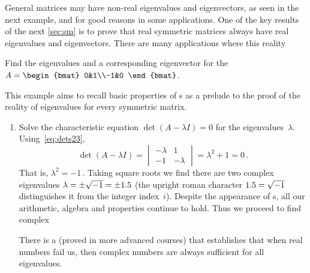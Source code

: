 General matrices may have non-real  eigenvalues and eigenvectors, as seen in the next example, and for good reasons in some applications.
One of the key results of the next \cref{sec:sm} is to prove that real symmetric matrices always have real eigenvalues and eigenvectors.
There are many applications where this reality 


\begin{example} \label{eg:ccevals}
Find the eigenvalues and a corresponding eigenvector for the  \(A=\begin{bmat} 0&1\\-1&0 \end{bmat}\).
\begin{aside}
This example aims to recall basic properties of s as a prelude to the proof of the reality of eigenvalues for every symmetric matrix.  
\end{aside}


\begin{solution} 
\begin{enumerate}
\item Solve the characteristic equation \(\det(A-\lambda I)=0\) for the eigenvalues~\(\lambda\).
Using~\eqref{eq:dets23},
\begin{equation*}
\det(A-\lambda I)
=\begin{vmatrix} -\lambda&1\\-1&-\lambda \end{vmatrix}
=\lambda^2+1=0\,.
\end{equation*}
That is, \(\lambda^2=-1\)\,.  
Taking square roots we find there are two complex eigenvalues \(\lambda=\pm\sqrt{-1}=\pm 1.5\) (the upright roman character \(1.5=\sqrt{-1}\) distinguishes it from the integer index~\(i\)).
Despite the appearance of s, all our arithmetic, algebra and properties continue to hold.
Thus we proceed to find complex 

There is a  (proved in more advanced courses) that establishes that when real numbers fail us, then complex numbers are always sufficient for all eigenvalues.


\end{enumerate}
\end{solution}
\end{example}
